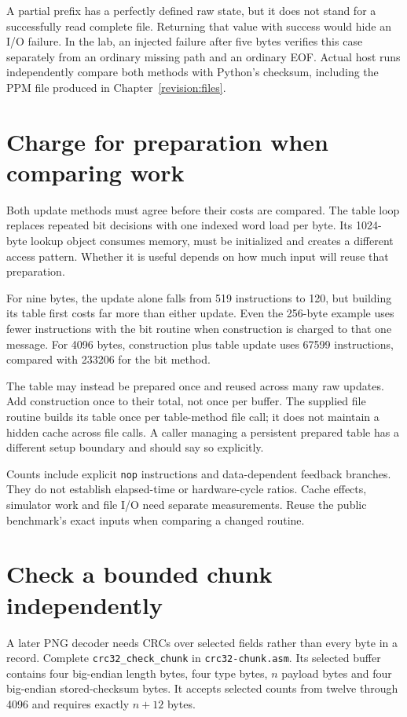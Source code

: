 A partial prefix has a perfectly defined raw state, but it does not stand for a
successfully read complete file. Returning that value with success would hide
an I/O failure. In the lab, an injected failure after five bytes verifies this
case separately from an ordinary missing path and an ordinary EOF. Actual host
runs independently compare both methods with Python's checksum, including the
PPM file produced in Chapter~\ref{revision:files}.

\section{Charge for preparation when comparing work}

Both update methods must agree before their costs are compared. The table loop
replaces repeated bit decisions with one indexed word load per byte. Its 1024-byte
lookup object consumes memory, must be initialized and creates a different access
pattern. Whether it is useful depends on how much input will reuse that preparation.



For nine bytes, the update alone falls from 519 instructions to 120, but building
its table first costs far more than either update. Even the 256-byte example uses
fewer instructions with the bit routine when construction is charged to that one
message. For 4096 bytes, construction plus table update uses 67599 instructions,
compared with 233206 for the bit method.

The table may instead be prepared once and reused across many raw updates. Add
construction once to their total, not once per buffer. The supplied file routine
builds its table once per table-method file call; it does not maintain a hidden
cache across file calls. A caller managing a persistent prepared table has a
different setup boundary and should say so explicitly.

Counts include explicit \texttt{nop} instructions and data-dependent feedback
branches. They do not establish elapsed-time or hardware-cycle ratios. Cache
effects, simulator work and file I/O need separate measurements. Reuse the public
benchmark's exact inputs when comparing a changed routine.

\section{Check a bounded chunk independently}

A later PNG decoder needs CRCs over selected fields rather than every byte in a
record. Complete \texttt{crc32\_check\_chunk} in \texttt{crc32-chunk.asm}.
Its selected buffer contains four big-endian length bytes, four type bytes,
$n$ payload bytes and four big-endian stored-checksum bytes. It accepts selected
counts from twelve through 4096 and requires exactly $n+12$ bytes.

